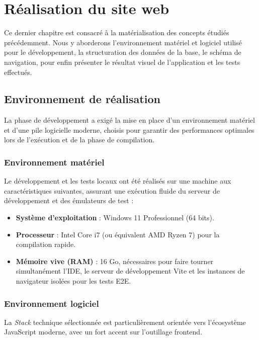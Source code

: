 ﻿\documentclass[12pt,a4paper,oneside]{report} %
\begin{document}
\chapter{Réalisation du site web}

Ce dernier chapitre est consacré à la matérialisation des concepts étudiés précédemment. Nous y aborderons l'environnement matériel et logiciel utilisé pour le développement, la structuration des données de la base, le schéma de navigation, pour enfin présenter le résultat visuel de l'application et les tests effectués.

\section{Environnement de réalisation}

La phase de développement a exigé la mise en place d'un environnement matériel et d'une pile logicielle moderne, choisis pour garantir des performances optimales lors de l'exécution et de la phase de compilation.

\subsection{Environnement matériel}

Le développement et les tests locaux ont été réalisés sur une machine aux caractéristiques suivantes, assurant une exécution fluide du serveur de développement et des émulateurs de test :
\begin{itemize}
    \item \textbf{Système d'exploitation} : Windows 11 Professionnel (64 bits).
    \item \textbf{Processeur} : Intel Core i7 (ou équivalent AMD Ryzen 7) pour la compilation rapide.
    \item \textbf{Mémoire vive (RAM)} : 16 Go, nécessaires pour faire tourner simultanément l'IDE, le serveur de développement Vite et les instances de navigateur isolées pour les tests E2E.
\end{itemize}

\subsection{Environnement logiciel}

La \textit{Stack} technique sélectionnée est particulièrement orientée vers l'écosystème JavaScript moderne, avec un fort accent sur l'outillage frontend.
\end{document}
